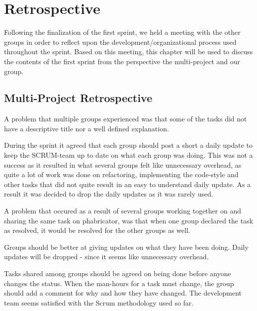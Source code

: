 \section{Retrospective}
Following the finalization of the first sprint, we held a meeting with the other
groups in order to reflect upon the development/organizational process used
throughout the sprint. Based on this meeting, this chapter will be used to
discuss the contents of the first sprint from the perspective the multi-project and our
group.

\subsection{Multi-Project Retrospective}


A problem that multiple groups experienced was that some of the tasks did not
have a descriptive title nor a well defined explanation.  

During the sprint it agreed that each group should post a short a daily update
to keep the SCRUM-team up to date on what each group was doing. This was not a
success as it resulted in what several groups felt like unnecessary overhead, as
quite a lot of work was done on refactoring, implementing the code-style and
other tasks that did not quite result in an easy to understand daily update. As
a result it was decided to drop the daily updates as it was rarely used.

A problem that occured as a result of several groups working together on and
sharing the same task on phabricator, was that when one group declared the task
as resolved, it would be resolved for the other groups as well.


Groups should be better at giving updates on what they have been doing.
Daily updates will be dropped - since it seems like unnecessary overhead.

Tasks shared among groups should be agreed on being done before anyone changes the status.
When the man-hours for a task must change, the group should add a comment for why and how they have changed.
The development team seems satisfied with the Scrum methodology used so far.

